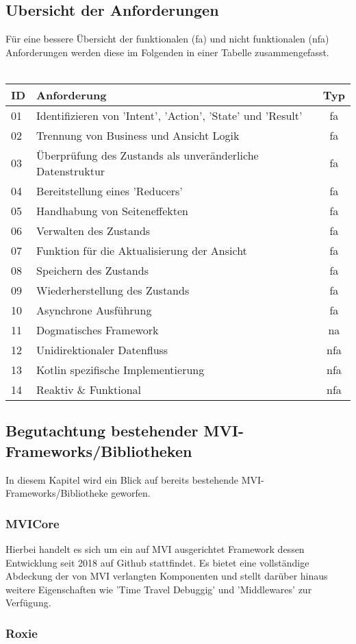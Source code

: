 \subsection{Ubersicht der Anforderungen}
Für eine bessere Übersicht der funktionalen (fa) und nicht funktionalen (nfa) Anforderungen werden diese im Folgenden in einer Tabelle zusammengefasst.
\\
\\
\begingroup
\setlength{\tabcolsep}{10pt} %
\renewcommand{\arraystretch}{1.5} %
\begin{tabular}{ | l | l | c | }
	\hline
	ID & Anforderung & Typ
	\\
	\hline
	01 & Identifizieren von 'Intent', 'Action', 'State' und 'Result' & fa
	\\
	\hline	
	02 & Trennung von Business und Ansicht Logik & fa
	\\
	\hline
	03 & Überprüfung des Zustands als unveränderliche Datenstruktur & fa
	\\
	\hline
	04 & Bereitstellung eines 'Reducers' & fa
	\\
	\hline
	05 & Handhabung von Seiteneffekten & fa 
	\\
	\hline
	06 & Verwalten des Zustands & fa 
	\\
	\hline
	07 & Funktion für die Aktualisierung der Ansicht & fa
	\\
	\hline
	08 & Speichern des Zustands & fa
	\\
	\hline
	09 & Wiederherstellung des Zustands & fa
	\\
	\hline
	10 & Asynchrone Ausführung & fa
	\\
	\hline
	11 & Dogmatisches Framework & na
	\\
	\hline
	12 & Unidirektionaler Datenfluss & nfa
	\\
	\hline
	13 & Kotlin spezifische Implementierung & nfa
	\\
	\hline
	14 & Reaktiv \& Funktional & nfa
	\\
	\hline
\end{tabular}
\endgroup

\subsection{Begutachtung bestehender MVI-Frameworks/Bibliotheken}
In diesem Kapitel wird ein Blick auf bereits bestehende MVI-Frameworks/Bibliotheke geworfen.

\subsubsection{MVICore}
Hierbei handelt es sich um ein auf MVI ausgerichtet Framework dessen Entwicklung seit 2018 auf Github stattfindet.
\cite{mviCoreGithub}
Es bietet eine vollständige Abdeckung der von MVI verlangten Komponenten und stellt darüber hinaus weitere Eigenschaften wie 'Time Travel Debuggig' und 'Middlewares' zur Verfügung.

\subsubsection{Roxie}